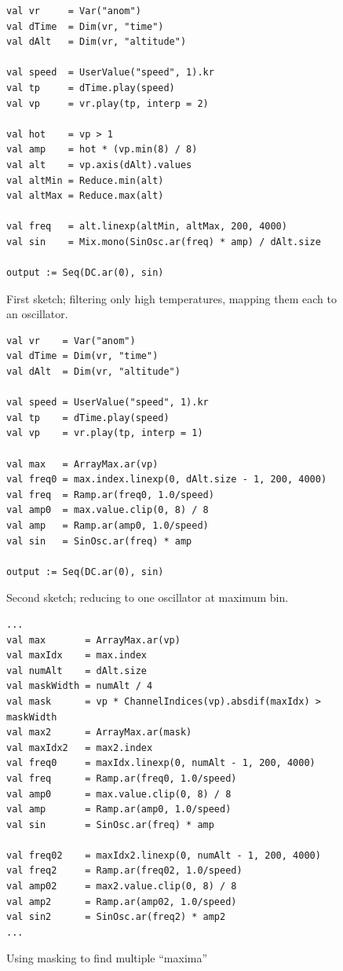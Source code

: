\documentclass[11pt,a4paper]{article}
\begin{document}
\begin{figure}
\begin{lstlisting}[style=scala]
val vr     = Var("anom")
val dTime  = Dim(vr, "time")
val dAlt   = Dim(vr, "altitude")

val speed  = UserValue("speed", 1).kr
val tp     = dTime.play(speed)
val vp     = vr.play(tp, interp = 2)

val hot    = vp > 1
val amp    = hot * (vp.min(8) / 8)
val alt    = vp.axis(dAlt).values
val altMin = Reduce.min(alt)
val altMax = Reduce.max(alt)

val freq   = alt.linexp(altMin, altMax, 200, 4000)
val sin    = Mix.mono(SinOsc.ar(freq) * amp) / dAlt.size

output := Seq(DC.ar(0), sin)
\end{lstlisting}
\caption{First sketch; filtering only high temperatures,
mapping them each to an oscillator.}
\label{fig:sonif-1-1}
\end{figure}

\begin{figure}
\begin{lstlisting}[style=scala]
val vr    = Var("anom")
val dTime = Dim(vr, "time")
val dAlt  = Dim(vr, "altitude")

val speed = UserValue("speed", 1).kr
val tp    = dTime.play(speed)
val vp    = vr.play(tp, interp = 1)

val max   = ArrayMax.ar(vp)
val freq0 = max.index.linexp(0, dAlt.size - 1, 200, 4000)
val freq  = Ramp.ar(freq0, 1.0/speed)
val amp0  = max.value.clip(0, 8) / 8
val amp   = Ramp.ar(amp0, 1.0/speed)
val sin   = SinOsc.ar(freq) * amp

output := Seq(DC.ar(0), sin)
\end{lstlisting}
\caption{Second sketch; reducing to one oscillator at maximum bin.}
\label{fig:sonif-1-2}
\end{figure}

\begin{figure}
\begin{lstlisting}[style=scala]
...
val max       = ArrayMax.ar(vp)
val maxIdx    = max.index
val numAlt    = dAlt.size
val maskWidth = numAlt / 4
val mask      = vp * ChannelIndices(vp).absdif(maxIdx) > maskWidth
val max2      = ArrayMax.ar(mask)
val maxIdx2   = max2.index
val freq0     = maxIdx.linexp(0, numAlt - 1, 200, 4000)
val freq      = Ramp.ar(freq0, 1.0/speed)
val amp0      = max.value.clip(0, 8) / 8
val amp       = Ramp.ar(amp0, 1.0/speed)
val sin       = SinOsc.ar(freq) * amp

val freq02    = maxIdx2.linexp(0, numAlt - 1, 200, 4000)
val freq2     = Ramp.ar(freq02, 1.0/speed)
val amp02     = max2.value.clip(0, 8) / 8
val amp2      = Ramp.ar(amp02, 1.0/speed)
val sin2      = SinOsc.ar(freq2) * amp2
...
\end{lstlisting}
\caption{Using masking to find multiple ``maxima''}
\label{fig:sonif-multi-max}
\end{figure}


\end{document}
